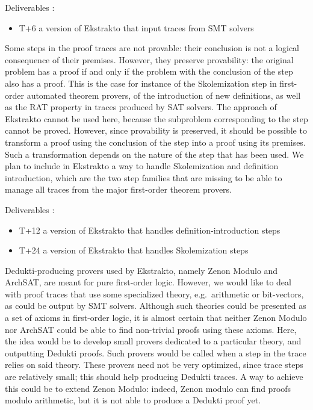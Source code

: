 \begin{workpackage}[id=atpetc,wphases=0-48,type=RTD,
  short=ATPs etc.,%
  title={ATP, SAT, SMT, Model checkers},
  lead=Lie,
  LieRM=10]
\begin{tasklist}
\begin{task}[id=tracetodedukti, title=Translate ATP traces into Dedukti]
\begin{compactenum}
  Deliverables :
  \begin{itemize}
  \item T+6 a version of Ekstrakto that input traces from SMT solvers
  \end{itemize}


\item  Some steps in the proof traces are not provable: their conclusion is
  not a logical consequence of their premises. However, they preserve
  provability: the original problem has a proof if and only if the
  problem with the conclusion of the step also has a proof. This is the
  case for instance of the Skolemization step in first-order automated
  theorem provers, of the introduction of new definitions, as well as
  the RAT property in traces produced by SAT solvers. The approach of
  Ekstrakto cannot be used here, because the subproblem corresponding to
  the step cannot be proved. However, since provability is preserved, it
  should be possible to transform a
  proof using the conclusion of the step into a proof using its
  premises. Such a transformation depends on the nature of the step that
  has been used. We plan to include in Ekstrakto a way to handle
  Skolemization and definition introduction, which are the two step
  families that are missing to be able to manage all traces from the
  major first-order theorem provers.

  Deliverables :
  \begin{itemize}
  \item T+12 a version of Ekstrakto that handles definition-introduction steps
  \item T+24 a version of Ekstrakto that handles Skolemization steps
  \end{itemize}



\item  Dedukti-producing provers used by Ekstrakto, namely Zenon Modulo and
  ArchSAT, are meant for pure first-order logic. However, we would like
  to deal with proof traces that use some specialized theory,
  e.g.\ arithmetic or bit-vectors, as could be output by SMT
  solvers. Although such theories could be presented as a set of axioms
  in first-order logic, it is almost certain that neither Zenon Modulo
  nor ArchSAT could be able to find non-trivial proofs using these
  axioms. Here, the idea would be to develop small provers dedicated to
  a particular theory, and outputting Dedukti proofs. Such provers would
  be called when a step in the trace relies on said theory. These
  provers need not be very optimized, since trace steps are relatively
  small; this should help producing Dedukti traces. A way to achieve
  this could be to extend Zenon Modulo: indeed, Zenon modulo can find
  proofs modulo arithmetic, but it is not able to produce a Dedukti
  proof yet.


\end{compactenum}
\end{task}
\end{tasklist}
\end{workpackage}

